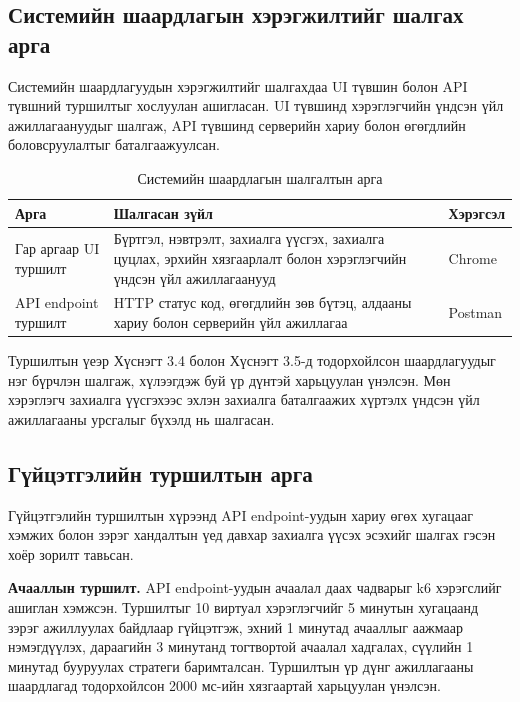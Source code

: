 \subsection{Системийн шаардлагын хэрэгжилтийг шалгах арга}

Системийн шаардлагуудын хэрэгжилтийг шалгахдаа UI түвшин болон API түвшний туршилтыг хослуулан ашигласан. UI түвшинд хэрэглэгчийн үндсэн үйл ажиллагаануудыг шалгаж, API түвшинд серверийн хариу болон өгөгдлийн боловсруулалтыг баталгаажуулсан.

\begin{table}[H]
\centering
\caption{Системийн шаардлагын шалгалтын арга}
\label{tab:requirement-test-strategy}
\begin{tabular}{p{4cm} p{7cm} p{3cm}}
\toprule
\textbf{Арга} & \textbf{Шалгасан зүйл} & \textbf{Хэрэгсэл} \\
\midrule
Гар аргаар UI туршилт &
Бүртгэл, нэвтрэлт, захиалга үүсгэх, захиалга цуцлах, эрхийн хязгаарлалт болон хэрэглэгчийн үндсэн үйл ажиллагаанууд &
Chrome \\
\hline
API endpoint туршилт &
HTTP статус код, өгөгдлийн зөв бүтэц, алдааны хариу болон серверийн үйл ажиллагаа &
Postman \\
\bottomrule
\end{tabular}
\end{table}

Туршилтын үеэр Хүснэгт 3.4 болон Хүснэгт 3.5-д тодорхойлсон шаардлагуудыг нэг бүрчлэн шалгаж, хүлээгдэж буй үр дүнтэй харьцуулан үнэлсэн. Мөн хэрэглэгч захиалга үүсгэхээс эхлэн захиалга баталгаажих хүртэлх үндсэн үйл ажиллагааны урсгалыг бүхэлд нь шалгасан.
\subsection{Гүйцэтгэлийн туршилтын арга}

Гүйцэтгэлийн туршилтын хүрээнд API endpoint-уудын хариу өгөх хугацааг хэмжих болон зэрэг хандалтын үед давхар захиалга үүсэх эсэхийг шалгах гэсэн хоёр зорилт тавьсан.

\textbf{Ачааллын туршилт.} API endpoint-уудын ачаалал даах чадварыг k6 хэрэгслийг ашиглан хэмжсэн. Туршилтыг 10 виртуал хэрэглэгчийг 5 минутын хугацаанд зэрэг ажиллуулах байдлаар гүйцэтгэж, эхний 1 минутад ачааллыг аажмаар нэмэгдүүлэх, дараагийн 3 минутанд тогтвортой ачаалал хадгалах, сүүлийн 1 минутад бууруулах стратеги баримталсан. Туршилтын үр дүнг ажиллагааны шаардлагад тодорхойлсон 2000 мс-ийн хязгаартай харьцуулан үнэлсэн.

